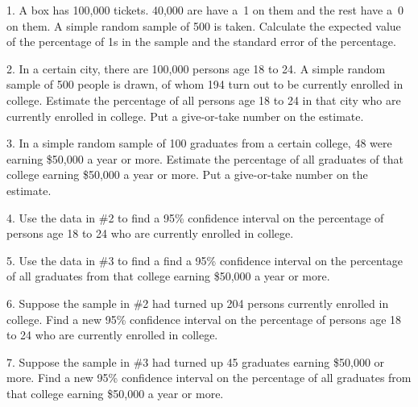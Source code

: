 \documentclass[10pt]{article}
\begin{document}
1. A box has 100,000 tickets.  40,000 are have a~1 on them and the rest have
a~0 on them.  A simple random sample of 500 is taken.  Calculate the expected
value of the percentage of 1s in the sample and the standard error of the 
percentage.
\vfill
\eject

2. In a certain city, there are 100,000 persons age 18 to 24.  
A simple random sample of 500 people is drawn, of whom 194 turn out to be 
currently enrolled in college.  Estimate the percentage of all persons 
age 18 to 24 in that city who are currently enrolled in college.
Put a give-or-take number on the estimate.
\vspace{1.4in}

3. In a simple random sample of 100 graduates from a certain college, 48 were earning
\$50,000 a year or more.  Estimate the percentage of all graduates of that
college earning \$50,000 a year or more.  Put a give-or-take number on the estimate.
\vspace{1.4in}

4. Use the data in \#2 to 
find a 95\% confidence interval on the percentage of persons age 18 to 24
who are currently enrolled in college.
\vspace{1.2in}

5. Use the data in \#3 to find a find a 95\% confidence interval on the
percentage of all graduates from that college earning \$50,000 a year or more.
\vspace{1.2in}

6. Suppose the sample in \#2 had turned up 204 persons currently 
enrolled in college.  Find a new 95\% confidence interval
on the percentage of persons age 18 to 24
who are currently enrolled in college.
\vspace{1.2in}

7. Suppose the sample in \#3 had turned up 45 graduates earning
\$50,000 or more.  Find a new 95\% confidence interval on the
percentage of all graduates from that college earning \$50,000 a year or more.

\vfill
\eject
\end{document}
